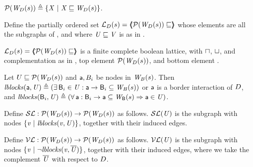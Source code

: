 \begin{definition} \label{defn:wsetOfSubgraphsLoc}
$\lwfgS{B}{s}{\DS} \df  \set{ \XS \stt \XS \subg \lwfg{B}{s}{\DS} }$.
\end{definition}

\begin{definition} \label{defn:wflatticeLoc}
Define the partially ordered set 
$\llat{\B}{s}{\DS}  = \tpl{ \lwfgS{B}{s}{\DS}  \subg }$ 
whose elements are all the subgraphs of 
, and where  $\US \subg \VS$ is as in .   
\end{definition}

\begin{proposition} \label{prop:isALatticeLoc}
$\llat{\B}{s}{\DS}  = \tpl{ \lwfgS{B}{s}{\DS}  \subg }$
 is a finite complete boolean lattice, with $\meet$, $\join$, and complementation as in 
, top element $\lwfgS{B}{s}{\DS}$, and bottom element \ewfg.
\end{proposition}

\begin{definition} \label{defn:blocksLoc}
Let $U \subg \lwfgS{B}{s}{\DS}$ and $\act, B_i$ be nodes in $\wfg{B}{s}$. Then 
$\lblocks{\act}{\US} \df (\ex \B_i \in \US : \act \ar \B_i \sub \wfg{B}{s})$ or $\act$ is a border interaction of $\DS$, and 
$\lblocks{\B_i}{\US} \df (\fa \act : \B_i \ar \act \sub\wfg{\B}{s} \imp \act \in \US)$.
\end{definition}


\begin{definition}[$\lSFs$] \label{defn:scFixLoc}
Define $\lSFs:  \lwfgS{B}{s}{\DS}  \to  \lwfgS{B}{s}{\DS}$ as follows.
$\lSF{\US}$ is the subgraph with nodes $\set{\ndv \stt \lblocks{\ndv}{\US} }$, together with their induced edges.
\end{definition}

\begin{definition}[$\lVFs$] \label{defn:violFixLoc}
Define $\lVFs: \lwfgS{B}{s}{\DS}  \to  \lwfgS{B}{s}{\DS}$ as follows.
$\lVF{\US}$ is the subgraph with nodes $\set{\ndv \stt \neg \lblocks{\ndv}{\compl{\US}} }$, together with their induced edges, 
where we take the complement $\compl{\US}$ with respect to $\DS$.
\end{definition}

